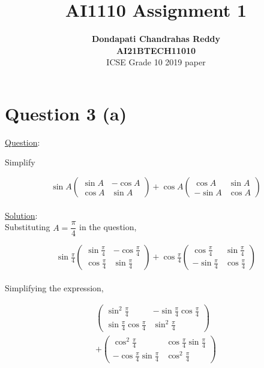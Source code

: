 \documentclass[journal,12pt,twocolumn]{IEEEtran}
\newcommand{\myvec}[1]{\ensuremath{\begin{pmatrix}#1\end{pmatrix}}}
\begin{document}
\title{\textbf{AI1110 Assignment 1} }
\author{\textbf{Dondapati Chandrahas Reddy}\\ \textbf{AI21BTECH11010}\\ ICSE Grade 10 2019 paper}

\maketitle

\section {Question 3 (a) \newline}

{\large \underline{Question}:\newline}

Simplify

\begin{equation}
	\sin A\myvec{\sin A &  -\cos A \\ \cos A & \sin A} + \cos A \myvec{\cos A &  \sin A \\ -\sin A & \cos A}
\end{equation}\\

{\large \underline{Solution}:}\\

Substituting $A = \dfrac{\pi}{4}$ in the question,

\begin{equation}
	\sin \tfrac{\pi}{4}\myvec{\sin \tfrac{\pi}{4} &  -\cos \tfrac{\pi}{4} \\ \cos \tfrac{\pi}{4} & \sin \tfrac{\pi}{4}} + \cos \tfrac{\pi}{4} \myvec{\cos \tfrac{\pi}{4} &  \sin \tfrac{\pi}{4} \\ -\sin \tfrac{\pi}{4} & \cos \tfrac{\pi}{4}}
\end{equation}\\

Simplifying the expression,

\begin{multline}
	\myvec{\sin^2 \tfrac{\pi}{4} &  -\sin \tfrac{\pi}{4}\cos \tfrac{\pi}{4} \\[1ex] \sin \tfrac{\pi}{4}\cos \tfrac{\pi}{4} & \sin^2 \tfrac{\pi}{4}} \\[1ex] 
	+ \myvec{\cos^2 \tfrac{\pi}{4} & \cos \tfrac{\pi}{4}\sin \tfrac{\pi}{4} \\[1ex] -\cos \tfrac{\pi}{4}\sin \tfrac{\pi}{4} & \cos^2 \tfrac{\pi}{4}}
\end{multline}\\
\end{document}
